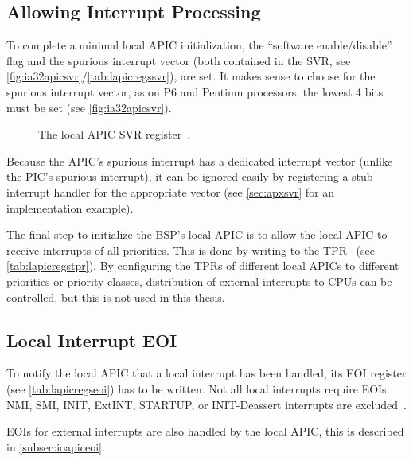\subsection{Allowing Interrupt Processing}
\label{subsec:lapicsoftenable}

To complete a minimal local APIC initialization, the ``software enable/disable'' flag and the
spurious interrupt vector (both contained in the SVR, see
\autoref{fig:ia32apicsvr}/\autoref{tab:lapicregssvr}), are set. It makes sense to choose
 for the spurious interrupt vector, as on P6 and Pentium processors, the lowest 4 bits
must be set (see \autoref{fig:ia32apicsvr}).

\begin{figure}[h]
  \centering
  \begin{subfigure}[b]{0.7\textwidth}
    
  \end{subfigure}
  \caption{The local APIC SVR register~\cite[sec.~3.11.9]{ia32}.}
  \label{fig:ia32apicsvr}
\end{figure}

Because the APIC's spurious interrupt has a dedicated interrupt vector (unlike the PIC's spurious
interrupt), it can be ignored easily by registering a stub interrupt handler for the appropriate
vector (see \autoref{sec:apxsvr} for an implementation example).

The final step to initialize the BSP's local APIC is to allow the local APIC to receive interrupts
of all priorities. This is done by writing  to the TPR~\cite[sec.~3.11.8.3]{ia32} (see
\autoref{tab:lapicregstpr}). By configuring the TPRs of different local APICs to different
priorities or priority classes, distribution of external interrupts to CPUs can be controlled, but
this is not used in this thesis.

\subsection{Local Interrupt EOI}
\label{subsec:lapiceoi}

To notify the local APIC that a local interrupt has been handled, its EOI register (see
\autoref{tab:lapicregseoi}) has to be written. Not all local interrupts require EOIs: NMI, SMI,
INIT, ExtINT, STARTUP, or INIT-Deassert interrupts are excluded~\cite[sec.~3.11.8.5]{ia32}.

EOIs for external interrupts are also handled by the local APIC, this is described in
\autoref{subsec:ioapiceoi}.

